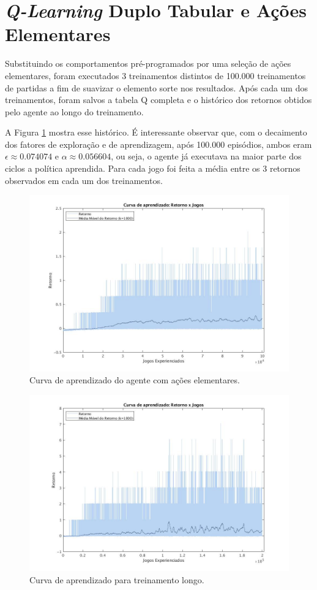 \section{\textit{Q-Learning} Duplo Tabular e Ações Elementares}

Substituindo os comportamentos pré-programados por uma seleção de ações elementares, foram executados 3 treinamentos distintos de 100.000 treinamentos de  partidas a fim de suavizar o elemento sorte nos resultados. Após cada um dos treinamentos, foram salvos a tabela Q completa e o histórico dos retornos obtidos pelo agente ao longo do treinamento.

A Figura \ref{fig:single-agent-curva} mostra esse histórico. É interessante observar que, com o decaimento dos fatores de exploração e de aprendizagem, após 100.000 episódios, ambos eram $\epsilon \approx 0.074074$ e $\alpha \approx 0.056604$, ou seja, o agente já executava na maior parte dos ciclos a política aprendida. Para cada jogo foi feita a média entre os 3 retornos observados em cada um dos treinamentos.

\begin{figure}[H]
	\includegraphics[width=0.93\linewidth]{figs/curva-qtabular.jpg}
	\centering
	\caption{Curva de aprendizado do agente com ações elementares. }
	\label{fig:single-agent-curva}
\end{figure}

\begin{figure}[H]
	\includegraphics[width=0.93\linewidth]{figs/curvalonga-qtabular.jpg}
	\centering
	\caption{Curva de aprendizado para treinamento longo.}
	\label{fig:single-agent-curvalonga}
\end{figure}

